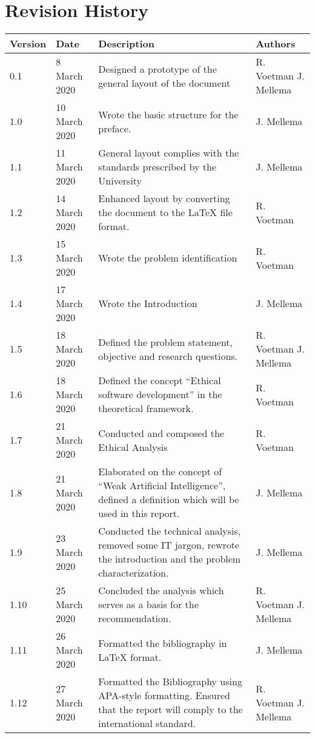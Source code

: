 \chapter*{Revision History}
\begin{center}
    \begin{tabularx}{\textwidth}{ | l | l | X | l | }
        \hline
        \textbf{Version}  & \textbf{Date}  & \textbf{Description}                                                    & \textbf{Authors} \\\hline
        0.1               & 8 March 2020   & Designed a prototype of the general layout of the document              & R. Voetman J. Mellema \\\hline
        1.0               & 10 March 2020  & Wrote the basic structure for the preface.                              & J. Mellema \\\hline
        1.1               & 11 March 2020  & General layout complies with the standards prescribed by the University & J. Mellema \\\hline
        1.2               & 14 March 2020  & Enhanced layout by converting the document to the LaTeX file format. & R. Voetman \\\hline
        1.3               & 15 March 2020  & Wrote the problem identification & R. Voetman \\\hline
        1.4               & 17 March 2020  & Wrote the Introduction & J. Mellema \\\hline
        1.5               & 18 March 2020  & Defined the problem statement, objective and research questions. & R. Voetman J. Mellema \\\hline
        1.6               & 18 March 2020  & Defined the concept “Ethical software development” in the theoretical framework. & R. Voetman \\\hline
        1.7               & 21 March 2020  & Conducted and composed the Ethical Analysis  & R. Voetman \\\hline
        1.8               & 21 March 2020  & Elaborated on the concept of “Weak Artificial Intelligence”, defined a definition which will be used in this report. & J. Mellema \\\hline
        1.9               & 23 March 2020  & Conducted the technical analysis, removed some IT jargon, rewrote the introduction and the problem characterization. & J. Mellema \\\hline
        1.10               & 25 March 2020  & Concluded the analysis which serves as a basis for the recommendation. & R. Voetman J. Mellema \\\hline
        1.11               & 26 March 2020  & Formatted the bibliography in LaTeX format. & J. Mellema \\\hline
        1.12               & 27 March 2020  & Formatted the Bibliography using APA-style formatting. Ensured that the report will comply to the international standard. & R. Voetman J. Mellema \\\hline

    \end{tabularx}
\end{center}